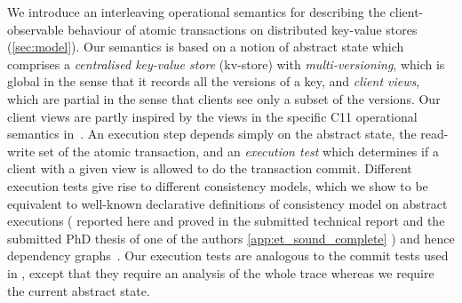 










We introduce an  {interleaving} operational semantics for
describing the client-observable behaviour of atomic transactions on
distributed key-value stores (\cref{sec:model}). Our semantics is
based on a notion of abstract state which 
comprises a  \emph{ centralised key-value store} (kv-store) with
\emph{multi-versioning}, which is {global} in the sense that it
records all the versions of a key, and
\emph{client views}, which are {partial} in the sense that  clients see only a subset of the
versions. Our client views are partly inspired by the views in the specific C11
operational semantics in~\cite{promises}.   An execution step
 depends
simply on the abstract state, the read-write set of the atomic transaction, and an \emph{execution test} which
determines if a client with a given view is allowed to do the
transaction commit. Different execution tests give rise to different consistency models, 
which we show to be equivalent to well-known
declarative definitions of consistency model on abstract executions (%
\ifTechRepEdits%
reported here and proved in the submitted  technical report and the
submitted PhD thesis of one of the authors%
\else%
\cref{app:et_sound_complete}%
\fi%
) and hence dependency graphs~\cite{laws}. 
Our execution tests are analogous to the commit tests used in \cite{seebelieve},
except that they require an analysis of the whole trace whereas we require the current abstract state. 




